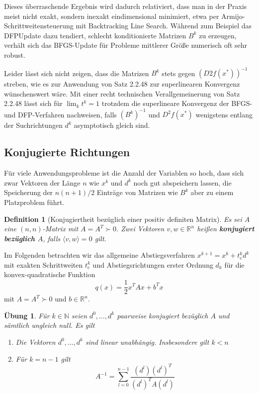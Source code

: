 \documentclass[11pt]{scrreprt}
\newcounter{thm}
\theoremstyle{thmstyle}
\numberwithin{thm}{section}
\newtheorem{definition}[thm]{Definition}
\newtheorem{uebung}[thm]{Übung}
\begin{document}
Dieses überraschende Ergebnis wird dadurch relativiert, dass man in der Praxis meist nicht exakt, sondern inexakt eindimensional minimiert, etwa per Armijo-Schrittweitensteuerung mit Backtracking Line Search. Während zum Beispiel das DFPUpdate dazu tendiert, schlecht konditionierte Matrizen $B^k$ zu erzeugen, verhält sich das BFGS-Update für Probleme mittlerer Größe numerisch oft sehr robust. ~\bigskip

Leider lässt sich nicht zeigen, dass die Matrizen $B^k$ stets gegen $(D2f(x^*))^{-1}$ streben, wie es zur Anwendung von Satz 2.2.48 zur superlinearen Konvergenz wünschenswert wäre. Mit einer recht technischen Verallgemeinerung von Satz 2.2.48 lässt sich für $\lim_k t^k = 1$ trotzdem die superlineare Konvergenz der BFGS- und DFP-Verfahren nachweisen, falls $(B^k)^{-1}$ und $D^2 f(x^*)$ wenigstens entlang der Suchrichtungen $d^k$ asymptotisch gleich sind.
		
\subsection*{Konjugierte Richtungen}		
		
Für viele Anwendungsprobleme ist die Anzahl der Variablen so hoch, dass sich zwar Vektoren der Länge $n$ wie $x^k$ und $d^k$ noch gut abspeichern lassen, die Speicherung der $n(n + 1)/2$ Einträge von Matrizen wie $B^k$ aber zu einem Platzproblem führt.	
		
\begin{definition}[Konjugiertheit bezüglich einer positiv definiten Matrix]
	Es sei $A$ eine $(n,n)$-Matrix mit $A = A^T \succ 0$. Zwei Vektoren $v, w \in \mathbb{R}^n$ heißen \textbf{konjugiert bezüglich $A$}, falls $\langle v, w \rangle = 0$ gilt.
\end{definition}	

Im Folgenden betrachten wir das allgemeine Abstiegsverfahren $x^{k+1} = x^k + t_e^k d^k$ mit exakten Schrittweiten $t_e^k$ und Abstiegsrichtungen erster Ordnung $d_k$ für die konvex-quadratische Funktion
	$$ q(x) = \frac{1}{2}x^T A x + b^T x $$
mit $A = A^T \succ 0$ und $b \in \mathbb{R}^n$.

\begin{uebung}
	Für $k \in \mathbb{N}$ seien $d^0, \dotsc, d^k$ paarweise konjugiert bezüglich $A$ und sämtlich ungleich null. Es gilt
	\begin{enumerate}[label=\alph*\upshape)]
		\item Die Vektoren $d^0, \dotsc, d^k$ sind linear unabhängig. Insbesondere gilt $k < n$
		\item Für $k = n - 1$ gilt
			$$ A^{-1} = \sum_{l=0}^{n-1} \frac{(d^l)(d^l)^T}{(d^l)^T A (d^l)} $$	
	\end{enumerate}
\end{uebung}	
		
\end{document}
